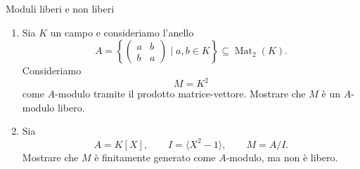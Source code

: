 \documentclass[a4paper]{article}
\begin{document}
\begin{radioactive}
\begin{snippetexercise}{Moduli liberi e non liberi}
    \begin{enumerate}
        \item Sia \(K\) un campo e consideriamo l'anello
        \[
            A=
            \left\{
                \begin{pmatrix}
                    a & b \\
                    b & a
                \end{pmatrix}
                \mid
                a,b\in K
            \right\}
            \subseteq \operatorname{Mat}_2(K).
        \]
        Consideriamo
        \[
            M=K^2
        \]
        come \(A\)-modulo tramite il prodotto matrice-vettore. Mostrare che \(M\) è un \(A\)-modulo libero.

        \item Sia
        \[
            A=K[X],
            \qquad
            I=\langle X^2-1 \rangle,
            \qquad
            M=A/I.
        \]
        Mostrare che \(M\) è finitamente generato come \(A\)-modulo, ma non è libero.
    \end{enumerate}
\end{snippetexercise}
\end{radioactive}
\end{document}

